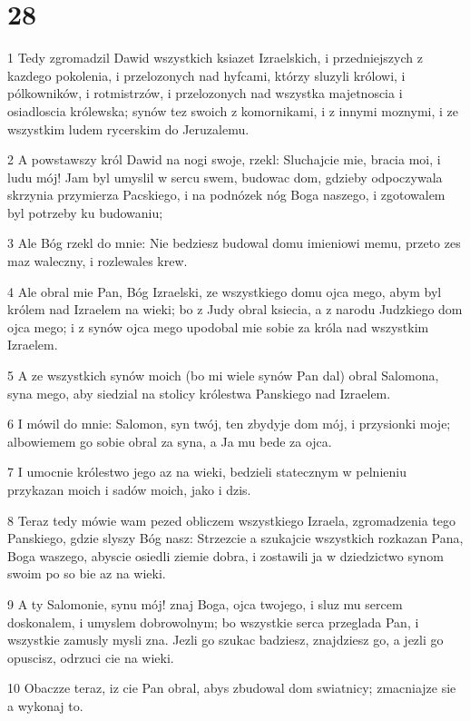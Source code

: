 \chapter{28}

\par 1 Tedy zgromadzil Dawid wszystkich ksiazet Izraelskich, i przedniejszych z kazdego pokolenia, i przelozonych nad hyfcami, którzy sluzyli królowi, i pólkowników, i rotmistrzów, i przelozonych nad wszystka majetnoscia i osiadloscia królewska; synów tez swoich z komornikami, i z innymi moznymi, i ze wszystkim ludem rycerskim do Jeruzalemu.
\par 2 A powstawszy król Dawid na nogi swoje, rzekl: Sluchajcie mie, bracia moi, i ludu mój! Jam byl umyslil w sercu swem, budowac dom, gdzieby odpoczywala skrzynia przymierza Pacskiego, i na podnózek nóg Boga naszego, i zgotowalem byl potrzeby ku budowaniu;
\par 3 Ale Bóg rzekl do mnie: Nie bedziesz budowal domu imieniowi memu, przeto zes maz waleczny, i rozlewales krew.
\par 4 Ale obral mie Pan, Bóg Izraelski, ze wszystkiego domu ojca mego, abym byl królem nad Izraelem na wieki; bo z Judy obral ksiecia, a z narodu Judzkiego dom ojca mego; i z synów ojca mego upodobal mie sobie za króla nad wszystkim Izraelem.
\par 5 A ze wszystkich synów moich (bo mi wiele synów Pan dal) obral Salomona, syna mego, aby siedzial na stolicy królestwa Panskiego nad Izraelem.
\par 6 I mówil do mnie: Salomon, syn twój, ten zbydyje dom mój, i przysionki moje; albowiemem go sobie obral za syna, a Ja mu bede za ojca.
\par 7 I umocnie królestwo jego az na wieki, bedzieli statecznym w pelnieniu przykazan moich i sadów moich, jako i dzis.
\par 8 Teraz tedy mówie wam pezed obliczem wszystkiego Izraela, zgromadzenia tego Panskiego, gdzie slyszy Bóg nasz: Strzezcie a szukajcie wszystkich rozkazan Pana, Boga waszego, abyscie osiedli ziemie dobra, i zostawili ja w dziedzictwo synom swoim po so bie az na wieki.
\par 9 A ty Salomonie, synu mój! znaj Boga, ojca twojego, i sluz mu sercem doskonalem, i umyslem dobrowolnym; bo wszystkie serca przeglada Pan, i wszystkie zamusly mysli zna. Jezli go szukac badziesz, znajdziesz go, a jezli go opuscisz, odrzuci cie na wieki.
\par 10 Obaczze teraz, iz cie Pan obral, abys zbudowal dom swiatnicy; zmacniajze sie a wykonaj to.
